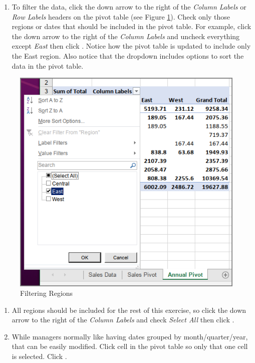 \begin{enumerate}[resume]
	\item To filter the data, click the down arrow to the right of the \textit{Column Labels} or \textit{Row Labels} headers on the pivot table (see Figure \ref{07:fig22}). Check only those regions or dates that should be included in the pivot table. For example, click the down arrow to the right of the \textit{Column Labels} and uncheck everything except \textit{East} then click . Notice how the pivot table is updated to include only the East region. Also notice that the dropdown includes options to sort the data in the pivot table.
\end{enumerate}

\begin{figure}[H]
	\centering
	\includegraphics[width=\maxwidth{.95\linewidth}]{gfx/ch07_fig22}
	\caption{Filtering Regions}
	\label{07:fig22}
\end{figure}

\begin{enumerate}[resume]
	\item All regions should be included for the rest of this exercise, so click the down arrow to the right of the \textit{Column Labels} and check \textit{Select All} then click .
	\item While managers normally like having dates grouped by month/quarter/year, that can be easily modified. Click cell  in the pivot table so only that one cell is selected. Click .
\end{enumerate}

